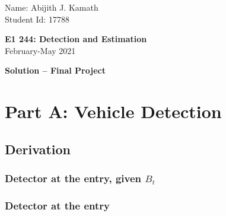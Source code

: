 \documentclass[11pt]{article}
\begin{document}
\thispagestyle{empty}

{\small
\begin{flushleft}
   Name: Abijith J. Kamath\\
   Student Id: 17788
\end{flushleft}
}
\vspace{2ex}
\begin{center}
    {\Large\bf E1 244: Detection and Estimation}\\
    February-May 2021

\vspace{5mm}
{\bf Solution -- Final Project}
\end{center}
\vspace{5mm}


\section{Part A: Vehicle Detection}
\label{sec:partA_Detection}



\subsection{Derivation}
\label{subsec:partA_derivation}


\subsubsection{Detector at the entry, given $B_{t}$}
\label{subsubsec:entryDetector}


\subsubsection{Detector at the entry}
\label{subsubsec:entryDetectorGeneralised}
\end{document}

